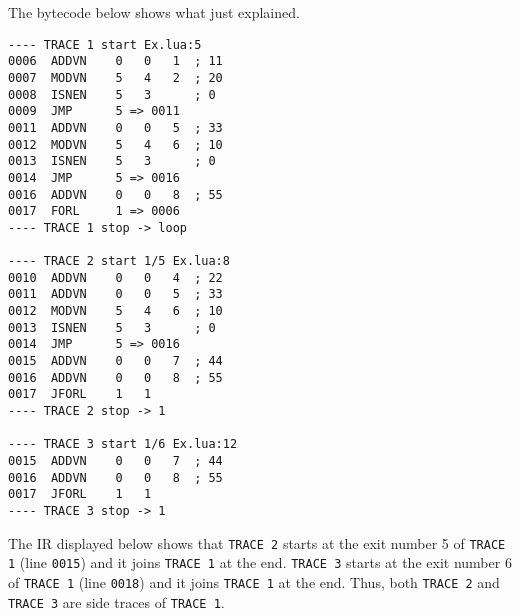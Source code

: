 The bytecode below shows what just explained.
\begin{multicols}{2}
\begin{lstlisting}[style=DumpStyle]
---- TRACE 1 start Ex.lua:5
0006  ADDVN    0   0   1  ; 11
0007  MODVN    5   4   2  ; 20
0008  ISNEN    5   3      ; 0
0009  JMP      5 => 0011
0011  ADDVN    0   0   5  ; 33
0012  MODVN    5   4   6  ; 10
0013  ISNEN    5   3      ; 0
0014  JMP      5 => 0016
0016  ADDVN    0   0   8  ; 55
0017  FORL     1 => 0006
---- TRACE 1 stop -> loop

---- TRACE 2 start 1/5 Ex.lua:8
0010  ADDVN    0   0   4  ; 22
0011  ADDVN    0   0   5  ; 33
0012  MODVN    5   4   6  ; 10
0013  ISNEN    5   3      ; 0
0014  JMP      5 => 0016
0015  ADDVN    0   0   7  ; 44
0016  ADDVN    0   0   8  ; 55
0017  JFORL    1   1
---- TRACE 2 stop -> 1

---- TRACE 3 start 1/6 Ex.lua:12
0015  ADDVN    0   0   7  ; 44
0016  ADDVN    0   0   8  ; 55
0017  JFORL    1   1
---- TRACE 3 stop -> 1
\end{lstlisting}
\end{multicols}

\noindent
The IR displayed below shows that \texttt{TRACE 2} starts at the exit number 5 of \texttt{TRACE 1} (line \texttt{0015}) and it joins \texttt{TRACE 1} at the end. \texttt{TRACE 3} starts at the exit number 6 of \texttt{TRACE 1} (line \texttt{0018}) and it joins \texttt{TRACE 1} at the end. Thus, both \texttt{TRACE 2} and \texttt{TRACE 3} are side traces of  \texttt{TRACE 1}.

